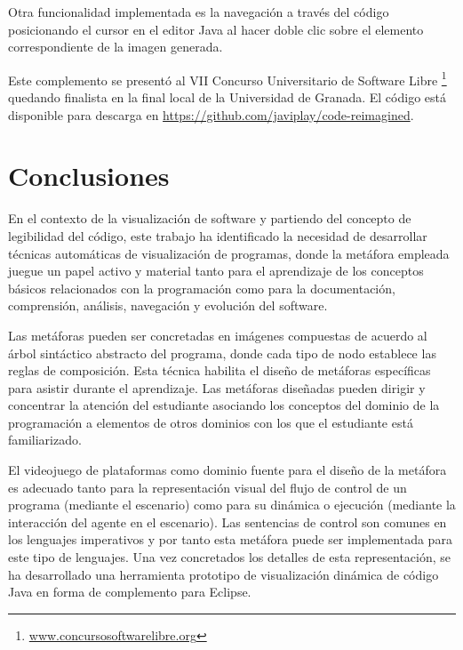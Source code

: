 \documentclass{llncs}
\begin{document}
Otra funcionalidad implementada es la navegación a través del código posicionando el cursor en el editor Java al hacer doble clic sobre el elemento correspondiente de la imagen generada.

Este complemento se presentó al VII Concurso Universitario de Software Libre \footnote{\url{www.concursosoftwarelibre.org}} quedando finalista en la final local de la Universidad de Granada. El código está disponible para descarga en \url{https://github.com/javiplay/code-reimagined}.



\section{Conclusiones}
\label{sec:conclusions}

En el contexto de la visualización de software y partiendo del concepto de legibilidad del código, este trabajo ha identificado la necesidad de desarrollar técnicas automáticas de visualización de programas, donde la metáfora empleada juegue un papel activo y material tanto para el aprendizaje de los conceptos básicos relacionados con la programación como para la documentación, comprensión, análisis, navegación y evolución del software.

Las metáforas pueden ser concretadas en imágenes compuestas de acuerdo al árbol sintáctico abstracto del programa, donde cada tipo de nodo establece las reglas de composición. Esta técnica habilita el diseño de metáforas específicas para asistir durante el aprendizaje. Las metáforas diseñadas pueden dirigir y concentrar la atención del estudiante asociando los conceptos del dominio de la programación a elementos de otros dominios con los que el estudiante está familiarizado. 

El videojuego de plataformas como dominio fuente para el diseño de la metáfora es adecuado tanto para la representación visual del flujo de control de un programa (mediante el escenario) como para su dinámica o ejecución (mediante la interacción del agente en el escenario). Las sentencias de control son comunes en los lenguajes imperativos y por tanto esta metáfora puede ser implementada para este tipo de lenguajes. Una vez concretados los detalles de esta representación, se ha desarrollado una herramienta prototipo de visualización dinámica de código Java en forma de complemento para Eclipse. 
\end{document}
